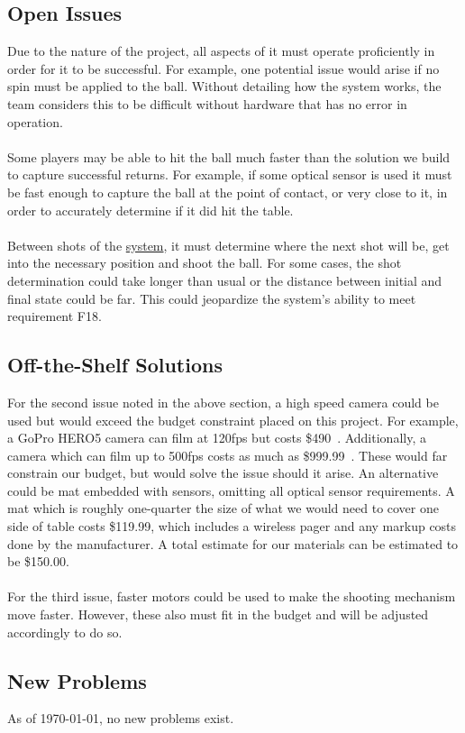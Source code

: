 \documentclass[11pt]{article}
\begin{document}
\subsection{Open Issues}
Due to the nature of the project, all aspects of it must operate proficiently in order for it to be successful. For example, one potential issue would arise if no spin must be applied to the ball. Without detailing how the system works, the team considers this to be difficult without hardware that has no error in operation. \\\\
Some players may be able to hit the ball much faster than the solution we build to capture successful returns. For example, if some optical sensor is used it must be fast enough to capture the ball at the point of contact, or very close to it, in order to accurately determine if it did hit the table. \\\\
Between shots of the \hyperref[sec:definitions]{system}, it must determine where the next shot will be, get into the necessary position and shoot the ball. For some cases, the shot determination could take longer than usual or the distance between initial and final state could be far. This could jeopardize the system's ability to meet requirement F18.
\subsection{Off-the-Shelf Solutions}
For the second issue noted in the above section, a high speed camera could be used but would exceed the budget constraint placed on this project. For example, a GoPro HERO5 camera can film at 120fps but costs \$490~\autocite{amazon-gopro}.
Additionally, a camera which can film up to 500fps costs as much as \$999.99~\autocite{all-sport}.
These would far constrain our budget, but would solve the issue should it arise. An alternative could be mat embedded with sensors, omitting all optical sensor requirements. A mat which is roughly one-quarter the size of what we would need to cover one side of table costs \$119.99, which includes a wireless pager and any markup costs done by the manufacturer. A total estimate for our materials can be estimated to be \$150.00.\\\\
For the third issue, faster motors could be used to make the shooting mechanism move faster. However, these also must fit in the budget and will be adjusted accordingly to do so.
\subsection{New Problems}
As of \today, no new problems exist.
\end{document}

